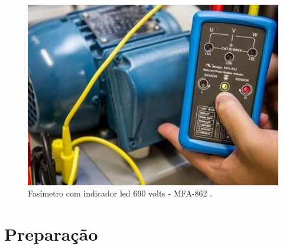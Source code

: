 \documentclass[a4paper,12pt,oneside,openany,table,xcdraw]{article}
\begin{document}
\vspace{0.3cm}
\begin{figure}[H]
\centering
\includegraphics[width=13cm]{fasimetro}
\caption{Fasímetro com indicador led 690 volts - MFA-862 \cite{fig1}.}
\label{intro:fig1}
\end{figure}
\vspace{0.3cm}


\section{Preparação}
\end{document}

